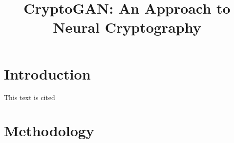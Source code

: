 \documentclass[conference]{IEEEtran}
\title{CryptoGAN: An Approach to Neural Cryptography}
\author{
  \IEEEauthorblockN{Alisamar Husain}
  \IEEEauthorblockA{
    Jamia Millia Islamia University\\
    New Delhi, India
  }
}
\begin{document}
  \maketitle

  \begin{abstract}
    \lipsum[1]
  \end{abstract}
 
  \section{Introduction}
  \lipsum[1]

  This text is cited \cite{visualloss}

  \section{Methodology}
  \lipsum
\end{document}
